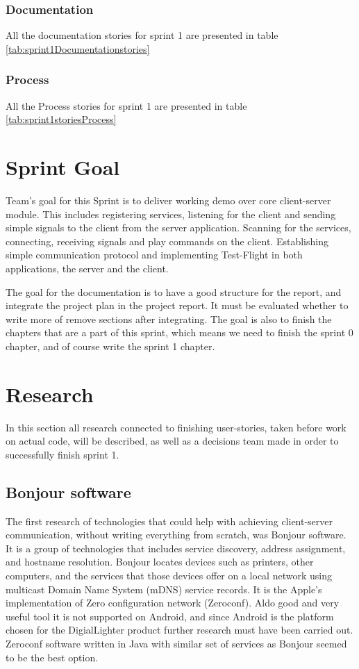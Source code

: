 \subsubsection*{Documentation}
All the documentation stories for sprint 1 are presented in table \ref{tab:sprint1Documentationstories}

\subsubsection*{Process}
All the Process stories for sprint 1 are presented in table \ref{tab:sprint1storiesProcess}

\section{Sprint Goal}

Team's goal for this Sprint is to deliver working demo over core client-server module.
This includes registering services, listening for the client and sending simple signals to the client from the server application.
Scanning for the services, connecting, receiving signals and play commands on the client.
Establishing simple communication protocol and implementing Test-Flight in both applications, the server and the client.

The goal for the documentation is to have a good structure for the report, and integrate the project plan in the project report. It must be evaluated whether to write more of remove sections after integrating. The goal is also to finish the chapters that are a part of this sprint, which means we need to finish the sprint 0 chapter, and of course write the sprint 1 chapter.

\section {Research}
In this section all research connected to finishing user-stories, taken before work on actual code, will be described, as well as a decisions team made in order to successfully finish sprint 1.

\subsection{Bonjour software}
The first research of technologies that could help with achieving client-server communication, without writing everything from scratch, was Bonjour software. 
It is a group of technologies that includes service discovery, address assignment, and hostname resolution. 
Bonjour locates devices such as printers, other computers, and the services that those devices offer on a local network using multicast Domain Name System (mDNS) service records.
It is the Apple's implementation of Zero configuration network (Zeroconf).
Aldo good and very useful tool it is not supported on Android, and since Android is the platform chosen for the DigialLighter product further research must have been carried out. 
Zeroconf software written in Java with similar set of services as Bonjour seemed to be the best option.

